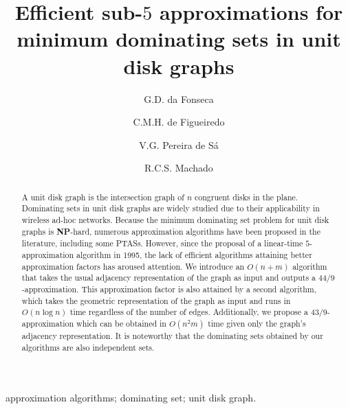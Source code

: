 \documentclass[preprint,12pt]{elsarticle}
\begin{document}
\begin{frontmatter}

\title{Efficient sub-$5$ approximations for\\minimum dominating sets in unit disk graphs}

\author[gf]{G.D. da Fonseca}

\author[ch]{C.M.H. de Figueiredo}

\author[vs]{V.G. Pereira de S\'a}

\author[rm]{R.C.S. Machado}

\address[gf]{Universidade Federal do Estado do Rio de Janeiro, Brazil}

\address[ch,vs]{Universidade Federal do Rio de Janeiro, Brazil}

\address[rm]{Instituto Nacional de Metrologia, Qualidade e Tecnologia, Brazil}

\begin{abstract}
A unit disk graph is the intersection graph of $n$ congruent disks in the plane. Dominating sets in unit disk graphs are widely studied due to their applicability in wireless ad-hoc networks. Because the minimum dominating set problem for unit disk graphs is \textbf{NP}-hard, numerous approximation algorithms have been proposed in the literature, including some PTASs.
However, since the proposal of a linear-time $5$-approximation algorithm in 1995, the lack of efficient algorithms attaining better approximation factors has aroused attention.
We introduce an $O(n+m)$ algorithm that takes the usual adjacency representation of the graph as input and outputs a $44/9$-approximation. This approximation factor is also attained by a second algorithm, which takes the geometric representation of the graph as input and runs in $O(n \log n)$ time regardless of the number of edges.
Additionally, we propose a $43/9$-approximation which can be obtained in $O(n^2 m)$ time given only the graph's adjacency representation. It is noteworthy that the dominating sets obtained by our algorithms are also independent sets.
\end{abstract}

\begin{keyword}
approximation algorithms; dominating set; unit disk graph.
\end{keyword}

\end{frontmatter}
\end{document}
